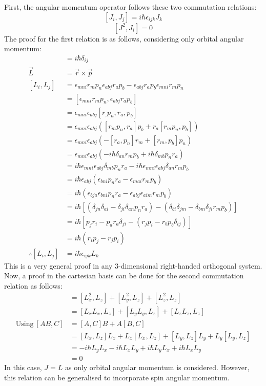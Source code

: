 \documentclass{article}
\begin{document}
\begin{flushleft}
First, the angular momentum operator follows these two commutation relations:
$$[J_i,J_j]=i\hbar\epsilon_{ijk}J_k$$
$$[J^2,J_i]=0$$
The proof for the first relation is as follows, considering only orbital angular momentum:
\begin{align*}
    [r_i,p_j]&=i\hbar\delta_{ij}\\
    \vec{L}&=\vec{r}\times \vec{p}\\
    [L_i,L_j]&=\epsilon_{mni}r_mp_n\epsilon_{abj}r_ap_b-\epsilon_{abj}r_ap_b\epsilon_{mni}r_mp_n\\
    &=[\epsilon_{mni}r_mp_n,\epsilon_{abj}r_ap_b]\\
    &=\epsilon_{mni}\epsilon_{abj}[r_,p_n,r_a,p_b]\\
    &=\epsilon_{mni}\epsilon_{abj}([r_mp_n,r_a]p_b+r_a[r_mp_n,p_b])\\
    &=\epsilon_{mni}\epsilon_{abj}(-[r_a,p_n]r_m+[r_m,p_b]p_n)\\
    &=\epsilon_{mni}\epsilon_{abj}(-i\hbar\delta_{an}r_mp_b+i\hbar\delta_{mb}p_nr_a)\\
    &=i\hbar\epsilon_{mni}\epsilon_{abj}\delta_{mb}p_nr_a-i\hbar\epsilon_{mni}\epsilon_{abj}\delta_{an}r_mp_b\\
    &=i\hbar\epsilon_{abj}(\epsilon_{bni}p_nr_a-\epsilon_{mai}r_mp_b)\\
    &=i\hbar(\epsilon_{bja}\epsilon_{bni}p_nr_a-\epsilon_{abj}\epsilon_{aim}r_mp_b)\\
    &=i\hbar[(\delta_{jn}\delta_{ai}-\delta_{ji}\delta_{an}p_nr_a)-(\delta_{bi}\delta_{jm}-\delta_{bm}\delta_{ji}r_mp_b)]\\
    &=i\hbar[p_jr_i-p_ar_a\delta_{ji}-(r_jp_i-r_bp_b\delta_{ij})]\\
    &=i\hbar(r_ip_j-r_jp_i)\\
    \therefore [L_i,L_j]&=i\hbar\epsilon_{ijk}L_k
\end{align*}
This is a very general proof in any 3-dimensional right-handed orthogonal system. Now, a proof in the cartesian basis can be done for the second commutation relation as follows:
\begin{align*}
    [L^2,L_z]&=[L_x^2,L_z]+[L_y^2,L_z]+[L_z^2,L_z]\\
    &=[L_xL_x,L_z]+[L_yL_y,L_z]+[L_zL_z,L_z]\\
    \text{Using}\ [AB,C]&=[A,C]B+A[B,C]\\
    &=[L_x,L_z]L_x+L_x[L_x,L_z]+[L_y,L_z]L_y+L_y[L_y,L_z]\\
    &=-i\hbar L_yL_x-i\hbar L_xL_y+i\hbar L_yL_x+i\hbar L_xL_y\\
    &=0
\end{align*}
In this case, $J=L$ as only orbital angular momentum is considered. However, this relation can be generalised to incorporate spin angular momentum.\\


\end{flushleft}
\end{document}

